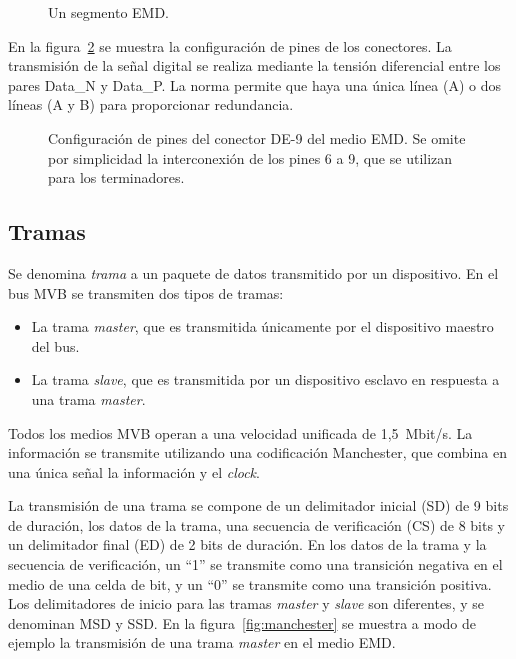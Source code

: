\begin{figure}[htbp]
	\centering
    {
        \fontsize{9pt}{9pt}\selectfont
        
    }
	\caption[Un segmento EMD]{Un segmento EMD.}
    \label{fig:segmento}
\end{figure}

En la figura~\ref{fig:db9} se muestra la configuración de pines de los conectores.
La transmisión de la señal digital se realiza mediante la tensión diferencial entre los pares Data\_N y Data\_P. La norma permite que haya una única línea (A) o dos líneas (A y B) para proporcionar redundancia.

\begin{figure}[htbp]
	\centering
    {
        \fontsize{8pt}{8pt}\selectfont
        
    }
	\caption[Configuración de pines del conector D-sub de 9 pines del medio EMD]{Configuración de pines del conector DE-9 del medio EMD. Se omite por simplicidad la interconexión de los pines 6 a 9, que se utilizan para los terminadores.}
    \label{fig:db9}
\end{figure}

\subsection{Tramas}

Se denomina \textit{trama} a un paquete de datos transmitido por un dispositivo.
En el bus MVB se transmiten dos tipos de tramas:

\begin{itemize}
\item La trama \textit{master}, que es transmitida únicamente por el dispositivo maestro del bus.
\item La trama \textit{slave}, que es transmitida por un dispositivo esclavo en respuesta a una trama \textit{master}.
\end{itemize}

Todos los medios MVB operan a una velocidad unificada de 1,5~Mbit/s.
La información se transmite utilizando una codificación Manchester, que combina en una única señal la información y el \textit{clock}.

La transmisión de una trama se compone de un delimitador inicial (SD) de 9 bits de duración, los datos de la trama, una secuencia de verificación (CS) de 8 bits y un delimitador final (ED) de 2 bits de duración.
En los datos de la trama y la secuencia de verificación, un ``1'' se transmite como una transición negativa en el medio de una celda de bit, y un ``0'' se transmite como una transición positiva.
Los delimitadores de inicio para las tramas \textit{master} y \textit{slave} son diferentes, y se denominan MSD y SSD.
En la figura~\ref{fig:manchester} se muestra a modo de ejemplo la transmisión de una trama \textit{master} en el medio EMD.

